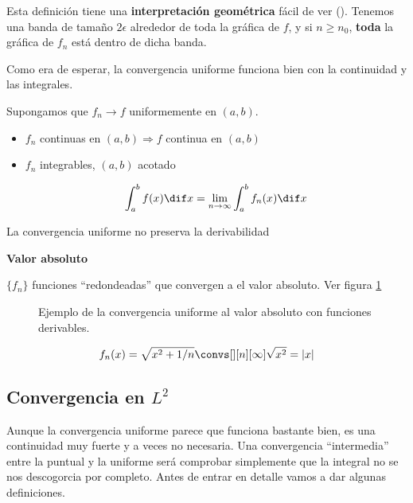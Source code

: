 		Esta definición tiene una \textbf{interpretación geométrica} fácil de ver (). Tenemos una banda de tamaño $2\epsilon$ alrededor de toda la gráfica de $f$, y si $n \geq n_0$, {\bf toda} la gráfica de $f_n$ está dentro de dicha banda.

		Como era de esperar, la convergencia uniforme funciona bien con la continuidad y las integrales.

		\begin{theorem} \label{thm:ConvergenciaUniforme}

			Supongamos que $f_n \rightarrow f$ uniformemente en $(a,b)$.

			\begin{itemize}
				\item $f_n$ continuas en $(a,b) \Rightarrow f$ continua en $(a,b)$

				\item $f_n$ integrables, $(a,b)$ acotado

				\[\int^{b}_{a} f(x) \dif x = \lim_{n \rightarrow \infty} \int^{b}_{a} f_n(x) \dif x \]
			\end{itemize}

			\obs La convergencia uniforme no preserva la derivabilidad

		\end{theorem}

		\begin{example}{\bf Valor absoluto}

			$\{f_n\}$ funciones ``redondeadas'' que convergen a el valor absoluto. Ver figura \ref{fig:convergenciaValorAbsoluto}

			\begin{figure}[thbp]
			\centering
			\caption{Ejemplo de la convergencia uniforme al valor absoluto con funciones derivables.}
			\label{fig:convergenciaValorAbsoluto}
			\end{figure}

			\[f_n(x) = \sqrt{x^2 + 1/n} \convs[][n][\infty] \sqrt{x^2} = |x| \]

		\end{example}

	\subsection{Convergencia en $L^2$}

		Aunque la convergencia uniforme parece que funciona bastante bien, es una continuidad muy fuerte y a veces no necesaria. Una convergencia ``intermedia'' entre la puntual y la uniforme será comprobar simplemente que la integral no se nos descogorcia por completo. Antes de entrar en detalle vamos a dar algunas definiciones.

